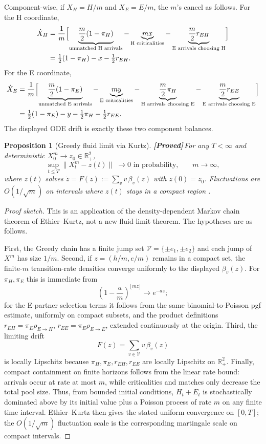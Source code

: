 \documentclass{article}
\theoremstyle{plain}
\newtheorem{proposition}{Proposition}
\theoremstyle{definition}
\newcommand{\proved}{\textcolor{provedgreen}{\textbf{[Proved]}}\,}
\begin{document}
Component-wise, if $X_H=H/m$ and $X_E=E/m$, the $m$'s cancel as follows. For the H coordinate,
\[
\begin{aligned}
\dot X_H
&=\frac{1}{m}\Bigl[
\underbrace{\frac m2(1-\pi_H)}_{\text{unmatched H arrivals}}
-\underbrace{mx}_{\text{H criticalities}}
-\underbrace{\frac m2 r_{EH}}_{\text{E arrivals choosing H}}
\Bigr]\\
&=\tfrac12(1-\pi_H)-x-\tfrac12 r_{EH}.
\end{aligned}
\]
For the E coordinate,
\[
\begin{aligned}
\dot X_E
&=\frac{1}{m}\Bigl[
\underbrace{\frac m2(1-\pi_E)}_{\text{unmatched E arrivals}}
-\underbrace{my}_{\text{E criticalities}}
-\underbrace{\frac m2\pi_H}_{\text{H arrivals choosing E}}
-\underbrace{\frac m2 r_{EE}}_{\text{E arrivals choosing E}}
\Bigr]\\
&=\tfrac12(1-\pi_E)-y-\tfrac12\pi_H-\tfrac12 r_{EE}.
\end{aligned}
\]
The displayed ODE drift is exactly these two component balances.

\begin{proposition}[Greedy fluid limit via Kurtz]\label{prop:kurtz}
\proved For any $T<\infty$ and deterministic $X^m_0\to z_0\in\mathbb{R}_+^2$,
\[
\sup_{t\le T}\|X^m_t-z(t)\|\;\longrightarrow 0\text{ in probability,}\qquad m\to\infty,
\]
where $z(t)$ solves $\dot z=F(z):=\sum_v v\,\beta_v(z)$ with $z(0)=z_0$. Fluctuations are $O(1/\sqrt m)$ on intervals where $z(t)$ stays in a compact region \cite[Ch.~11]{ethier_kurtz}.
\end{proposition}

\begin{proof}[Proof sketch]
This is an application of the density-dependent Markov chain theorem of Ethier--Kurtz, not a new fluid-limit theorem. The hypotheses are as follows.

First, the Greedy chain has a finite jump set $\mathcal V=\{\pm e_1,\pm e_2\}$ and each jump of $X^m$ has size $1/m$. Second, if $z=(h/m,e/m)$ remains in a compact set, the finite-$m$ transition-rate densities converge uniformly to the displayed $\beta_v(z)$. For $\pi_H,\pi_E$ this is immediate from
\[
\left(1-\frac{a}{m}\right)^{\lfloor mz\rfloor}\to e^{-az};
\]
for the E-partner selection terms it follows from the same binomial-to-Poisson pgf estimate, uniformly on compact subsets, and the product definitions $r_{EH}=\pi_E\rho_{E\to H}$, $r_{EE}=\pi_E\rho_{E\to E}$, extended continuously at the origin. Third, the limiting drift
\[
F(z)=\sum_{v\in\mathcal V}v\,\beta_v(z)
\]
is locally Lipschitz because $\pi_H,\pi_E,r_{EH},r_{EE}$ are locally Lipschitz on $\mathbb R_+^2$. Finally, compact containment on finite horizons follows from the linear rate bound: arrivals occur at rate at most $m$, while criticalities and matches only decrease the total pool size. Thus, from bounded initial conditions, $H_t+E_t$ is stochastically dominated above by its initial value plus a Poisson process of rate $m$ on any finite time interval. Ethier--Kurtz then gives the stated uniform convergence on $[0,T]$; the $O(1/\sqrt m)$ fluctuation scale is the corresponding martingale scale on compact intervals.
\end{proof}
\end{document}
